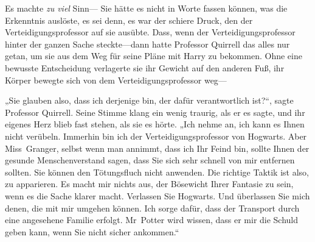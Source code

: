 Es machte \emph{zu viel} Sinn—
%
Sie hätte es nicht in Worte fassen können, was die Erkenntnis auslöste, es sei denn, es war der schiere Druck, den der Verteidigungsprofessor auf sie ausübte.
%
Dass, wenn der Verteidigungsprofessor hinter der ganzen Sache steckte—dann hatte Professor Quirrell das alles nur getan, um sie aus dem Weg für seine Pläne mit Harry zu bekommen.
%
Ohne eine bewusste Entscheidung verlagerte sie ihr Gewicht auf den anderen Fuß, ihr Körper bewegte sich von dem Verteidigungsprofessor weg—

„Sie glauben also, dass ich derjenige bin, der dafür verantwortlich ist?“, sagte Professor Quirrell. Seine Stimme klang ein wenig traurig, als er es sagte, und ihr eigenes Herz blieb fast stehen, als sie es hörte. „Ich nehme an, ich kann es Ihnen nicht verübeln. Immerhin bin ich der Verteidigungsprofessor von Hogwarts. Aber Miss~Granger, selbst wenn man annimmt, dass ich Ihr Feind bin, sollte Ihnen der gesunde Menschenverstand sagen, dass Sie sich sehr schnell von mir entfernen sollten. Sie können den Tötungsfluch nicht anwenden. Die richtige Taktik ist also, zu apparieren. Es macht mir nichts aus, der Bösewicht Ihrer Fantasie zu sein, wenn es die Sache klarer macht. Verlassen Sie Hogwarts. Und überlassen Sie mich denen, die mit mir umgehen können. Ich sorge dafür, dass der Transport durch eine angesehene Familie erfolgt. Mr~Potter wird wissen, dass er mir die Schuld geben kann, wenn Sie nicht sicher ankommen.“

